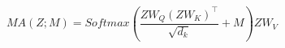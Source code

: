 \begin{equation}
\label{eq:masked-attention}
MA(Z;M)=Softmax\left( \frac{Z{W}_{Q}{\left( Z{W}_{K}\right) }^{\top }}{\sqrt{{d}_{k}}}+M\right) Z{W}_{V}
\end{equation}
